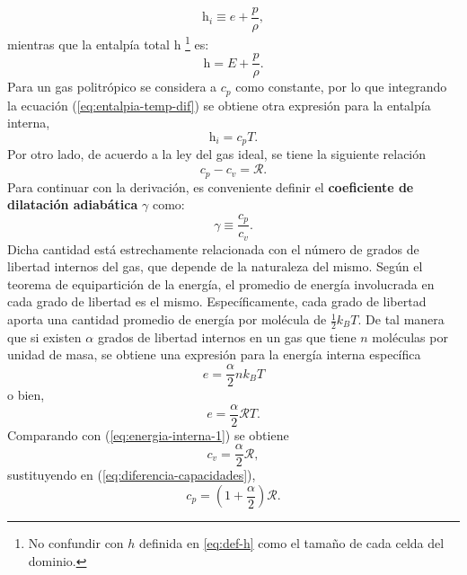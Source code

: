 \begin{equation}
	\mathrm{h}_i \equiv e + \frac{p}{\rho},
	\label{eq:entalpia-1}
\end{equation}
mientras que la entalpía total $\mathrm{h}$ \footnote{No confundir con $h$ definida en \ref{eq:def-h} como el tamaño de cada celda del dominio.} es:
\begin{equation}
	\mathrm{h} = E + \frac{p}{\rho}.
	\label{eq:entalpia-total}
\end{equation}
Para un gas politrópico se considera a $c_p$ como constante, por lo que integrando la ecuación (\ref{eq:entalpia-temp-dif}) se obtiene otra expresión para la entalpía interna,
\begin{equation}
	\mathrm{h}_i = c_p T.
	\label{eq:entalpia-2}
\end{equation}
Por otro lado, de acuerdo a la ley del gas ideal, se tiene la siguiente relación
\begin{equation}
	c_p - c_v = \mathcal{R}.
	\label{eq:diferencia-capacidades}
\end{equation}
Para continuar con la derivación, es conveniente definir el \textbf{coeficiente de dilatación adiabática} $\gamma$ como:
\begin{equation}
	\gamma \equiv \frac{c_p}{c_v}.
	\label{eq:gamma-1}
\end{equation}
Dicha cantidad está estrechamente relacionada con el número de grados de libertad internos del gas, que depende de la naturaleza del mismo. Según el teorema de equipartición de la energía, el promedio de energía involucrada en cada grado de libertad es el mismo. Específicamente, cada grado de libertad aporta una cantidad promedio de energía por molécula de $\frac{1}{2}k_B T$. De tal manera que si existen ${\alpha}$ grados de libertad internos en un gas que tiene $n$ moléculas por unidad de masa, se obtiene una expresión para la energía interna específica
\begin{equation}
	e = \frac{\alpha}{2}n k_B T
\end{equation}
o bien, 
\begin{equation}
	e = \frac{\alpha}{2}\mathcal{R} T.
	\label{eq:energia-interna-2}
\end{equation}
Comparando con (\ref{eq:energia-interna-1}) se obtiene
\begin{equation}
	c_v = \frac{\alpha}{2}\mathcal{R},
\end{equation}
sustituyendo en (\ref{eq:diferencia-capacidades}),
\begin{equation}
	c_p = \left(1+\frac{\alpha}{2}\right)\mathcal{R}.
\end{equation}
